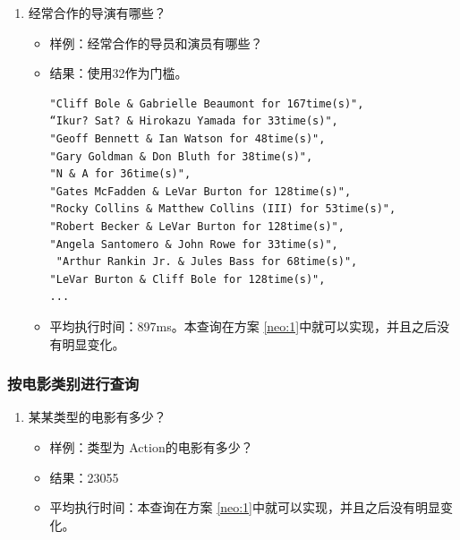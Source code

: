 \documentclass{ctexrep}
\begin{document}
\begin{enumerate}
\begin{itemize}
		\end{itemize}
		\item 经常合作的导演有哪些？\begin{itemize}
			\item 样例：经常合作的导员和演员有哪些？
			\item 结果：使用32作为门槛。\begin{lstlisting}
"Cliff Bole & Gabrielle Beaumont for 167time(s)",
“Ikur? Sat? & Hirokazu Yamada for 33time(s)",
"Geoff Bennett & Ian Watson for 48time(s)",
"Gary Goldman & Don Bluth for 38time(s)",
"N & A for 36time(s)",
"Gates McFadden & LeVar Burton for 128time(s)",
"Rocky Collins & Matthew Collins (III) for 53time(s)",
"Robert Becker & LeVar Burton for 128time(s)",
"Angela Santomero & John Rowe for 33time(s)",
 "Arthur Rankin Jr. & Jules Bass for 68time(s)",
"LeVar Burton & Cliff Bole for 128time(s)",
...
			\end{lstlisting}
			\item 平均执行时间：897ms。本查询在方案 \ref{neo:1}中就可以实现，并且之后没有明显变化。
		\end{itemize}
	\end{enumerate}
	\subsubsection{按电影类别进行查询}
		\begin{enumerate}
		\item 某某类型的电影有多少？\begin{itemize}
			\item 样例：类型为 Action的电影有多少？
			\item 结果：23055
			\item 平均执行时间：本查询在方案 \ref{neo:1}中就可以实现，并且之后没有明显变化。
		\end{itemize}
	\end{enumerate}
\end{document}
